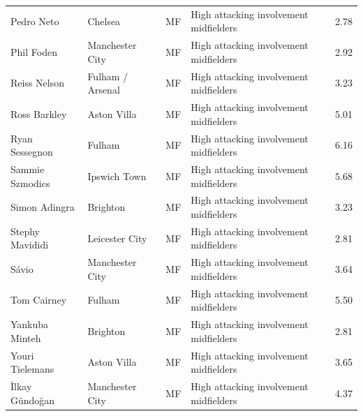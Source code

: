 \begin{longtable}{p{3.4cm}p{2.5cm}p{1.0cm}p{5.0cm}r}
Pedro Neto & Chelsea & MF & High attacking involvement midfielders & 2.78 \\
Phil Foden & Manchester City & MF & High attacking involvement midfielders & 2.92 \\
Reiss Nelson & Fulham / Arsenal & MF & High attacking involvement midfielders & 3.23 \\
Ross Barkley & Aston Villa & MF & High attacking involvement midfielders & 5.01 \\
Ryan Sessegnon & Fulham & MF & High attacking involvement midfielders & 6.16 \\
Sammie Szmodics & Ipswich Town & MF & High attacking involvement midfielders & 5.68 \\
Simon Adingra & Brighton & MF & High attacking involvement midfielders & 3.23 \\
Stephy Mavididi & Leicester City & MF & High attacking involvement midfielders & 2.81 \\
Sávio & Manchester City & MF & High attacking involvement midfielders & 3.64 \\
Tom Cairney & Fulham & MF & High attacking involvement midfielders & 5.50 \\
Yankuba Minteh & Brighton & MF & High attacking involvement midfielders & 2.81 \\
Youri Tielemans & Aston Villa & MF & High attacking involvement midfielders & 3.65 \\
İlkay Gündoğan & Manchester City & MF & High attacking involvement midfielders & 4.37 \\
\bottomrule
\end{longtable}
